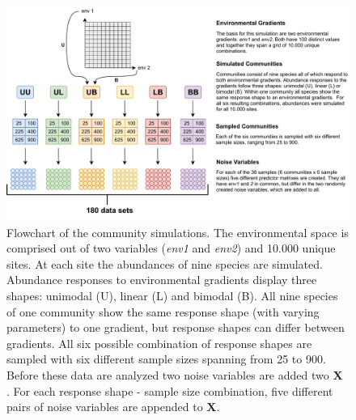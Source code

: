 \documentclass[a4paper,11pt]{article}
\begin{document}
		\begin{figure}[ht]
			\centering
			\includegraphics[width=1\linewidth]{figures/190917_MTP_MM_FLOWCHART.pdf}
			\caption{
			        Flowchart of the community simulations. 
			        The environmental space is comprised out of two variables (\textit{env1} and \textit{env2}) and 10.000 unique sites.
			        At each site the abundances of nine species are simulated. 
			        Abundance responses to environmental gradients display three shapes:
			        unimodal (U), linear (L) and bimodal (B). 
			         All nine species of one community show the same response shape (with varying parameters) to one gradient, but response shapes can differ between gradients. 
			         All six possible combination of response shapes are sampled with six different sample sizes spanning from 25 to 900.
                    Before these data are analyzed two noise variables are added two $\mathbf{X}$ .
                    For each response shape - sample size combination, five different pairs of noise variables are appended to $\mathbf{X}$. 
			        }
			\label{fig:flowchart_simulation}
		\end{figure}
	
	    
\end{document}
